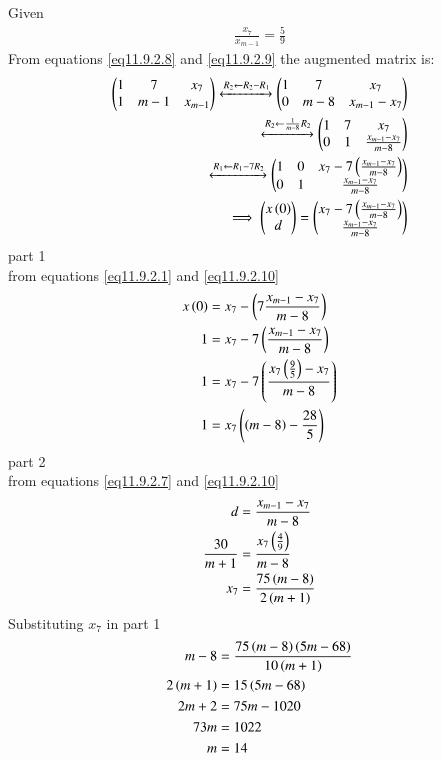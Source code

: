 \documentclass[journal,12pt,twocolumn]{IEEEtran}
\theoremstyle{remark}
\begin{document}
Given 
\begin{align}
\frac{x_{7}}{x_{m-1}} = \frac{5}{9} \label{eq11.9.2.10}
\end{align}
From  equations \ref{eq11.9.2.8} and \ref{eq11.9.2.9} the augmented matrix is:\\
\begin{align}
 \begin{pmatrix}
   1 & 7 & x_7
   \\
   1 & m-1 & x_{m-1}
 \end{pmatrix}
 \xleftrightarrow[]{R_2 \leftarrow {R_2-R_1}}
 \begin{pmatrix}
   1 & 7 & x_7
   \\
   0 & m-8 & x_{m-1}-x_7
 \end{pmatrix}
 \\
 \xleftrightarrow[]{R_2 \leftarrow {\frac{1}{m-8}R_2}}
 \begin{pmatrix}
   1 & 7 & x_7
   \\
   0 & 1 & \frac{x_{m-1}-x_7}{m-8}
 \end{pmatrix}
 \\
 \xleftrightarrow[]{R_1 \leftarrow {R_1-7{R_2}}}
 \begin{pmatrix}
   1 & 0 & x_7-7\left(\frac{x_{m-1}-x_7}{m-8}\right)
   \\
   0 & 1 & \frac{x_{m-1}-x_7}{m-8}
 \end{pmatrix}
 \\
 \implies \begin{pmatrix}
   x\left(0\right)
   \\
   d
 \end{pmatrix}
 =
 \begin{pmatrix}
   x_7-7\left(\frac{x_{m-1}-x_7}{m-8}\right)
   \\
   \frac{x_{m-1}-x_7}{m-8}
 \end{pmatrix}
\end{align}
part 1\\
from equations \ref{eq11.9.2.1} and \ref{eq11.9.2.10}\\
\begin{align}
    x\left(0\right)&=x_7-\left(7\frac{x_{m-1}-x_7}{m-8}\right)\\
    1&=x_7-7\left(\frac{x_{m-1}-x_7}{m-8}\right)\\
    1&=x_7-7\left(\frac{x_7\left(\frac{9}{5}\right)-x_7}{m-8}\right)\\
    1&=x_7\left(\left(m-8\right)-\frac{28}{5}\right)
\end{align}
part 2\\
from equations \ref{eq11.9.2.7} and \ref{eq11.9.2.10}\\
 \begin{align}
    d&=\frac{x_{m-1}-x_7}{m-8}\\
    \frac{30}{m+1}&=\frac{x_7\left(\frac{4}{9}\right)}{m-8}\\
    x_7&=\frac{75\left(m-8\right)}{2\left(m+1\right)}\\
 \end{align}
Substituting $x_7$ in part 1\\
 \begin{align}
    m-8&=\frac{75\left(m-8\right)\left(5m-68\right)}{10\left(m+1\right)}\\
    2\left(m+1\right)&=15\left(5m-68\right)\\
    2m+2&=75m-1020\\
    73m&=1022\\
    m&=14
 \end{align}
\end{document}
